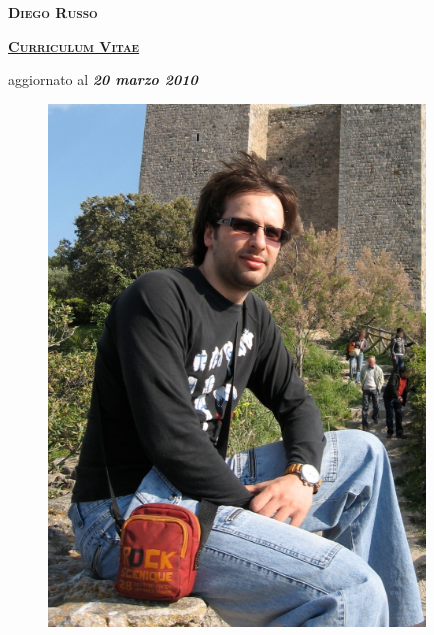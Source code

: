\documentclass[totpages,helvetica,openbib,italian]{europecv}
\begin{document}
    \begin{center}
        \hspace{1pt}
        \vspace{2cm}
    
        {\scshape \textbf{\Huge Diego Russo}}
    
        \vspace{1cm}
    
        {\scshape \textbf{\large \underline{Curriculum Vitae}}}
    
        \vspace{0.25cm}
    
        aggiornato al \emph{\textbf{20 marzo 2010}}
        
        \vspace{2cm}
        
        \begin{figure}[htbp] 
            \begin{center} 
                \includegraphics[width=10cm]{io.jpg}
            \end{center} 
        \end{figure}
        
    \end{center}
\pagebreak
{}
\end{document}
